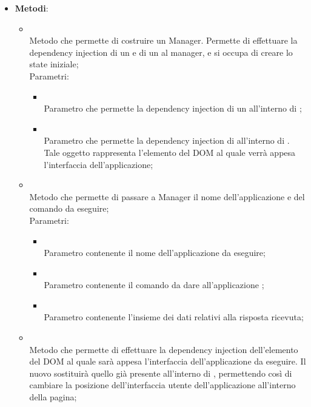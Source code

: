 \begin{itemize}
\begin{itemize}
	\end{itemize}
	\item \textbf{Metodi}:
	\begin{itemize}
		\item[]  \\		Metodo che permette di costruire un Manager. Permette di effettuare la dependency injection di un  e di un  al manager, e si occupa di creare lo state iniziale;\\
		Parametri:
		\begin{itemize}
			\item {} \\
			Parametro che permette la dependency injection di un  all'interno di ;
			\item {} \\
			Parametro che permette la dependency injection di  all'interno di . Tale oggetto rappresenta l'elemento del DOM al quale verrà appesa l'interfaccia dell'applicazione;
		\end{itemize}
		\item[]  \\		Metodo che permette di passare a Manager il nome dell'applicazione e del comando da eseguire;\\
		Parametri:
		\begin{itemize}
			\item {} \\
			Parametro contenente il nome dell'applicazione da eseguire;
			\item {} \\
			Parametro contenente il comando da dare all'applicazione ;
			\item {} \\
			Parametro contenente l'insieme dei dati relativi alla risposta ricevuta;
		\end{itemize}
		\item[]  \\		Metodo che permette di effettuare la dependency injection dell'elemento del DOM al quale sarà appesa l'interfaccia dell'applicazione da eseguire. Il nuovo  sostituirà quello già presente all'interno di , permettendo così di cambiare la posizione dell'interfaccia utente dell'applicazione all'interno della pagina;\\

\end{itemize}
\end{itemize}

